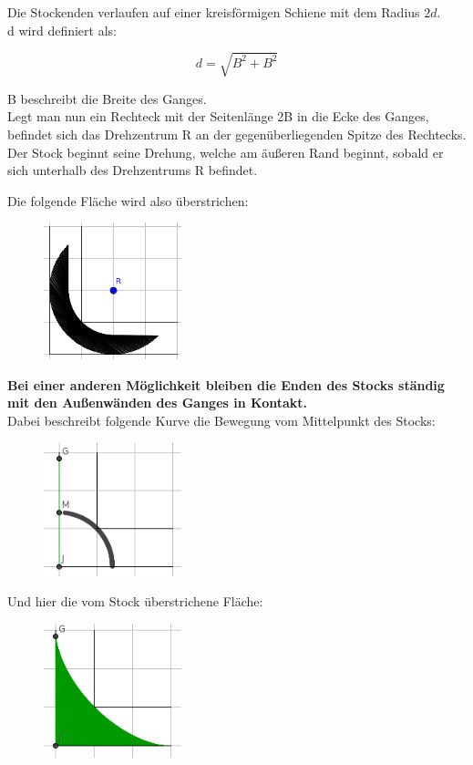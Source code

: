 \documentclass[a4paper,11pt]{article}
\begin{document}
Die Stockenden verlaufen auf einer kreisförmigen Schiene mit dem Radius $2d$. \\
d wird definiert als:

\[ d = \sqrt{B^2+B^2} \]

B beschreibt die Breite des Ganges. \\
Legt man nun ein Rechteck mit der Seitenlänge 2B in die Ecke des Ganges, befindet sich das Drehzentrum R an der gegenüberliegenden Spitze des Rechtecks. \\
Der Stock beginnt seine Drehung, welche am \"au\ss eren Rand beginnt, sobald er sich unterhalb des Drehzentrums R befindet.

Die folgende Fl\"ache wird also \"uberstrichen:
\begin{figure}[H] 
        \centering
        \includegraphics[width=4cm]{img/A4_2.png}
\end{figure}

\textbf{Bei einer anderen M\"oglichkeit bleiben die Enden des Stocks st\"andig mit den Au\ss enw\"anden des Ganges in Kontakt.} \\
Dabei beschreibt folgende Kurve die Bewegung vom Mittelpunkt des Stocks:
\begin{figure}[H] 
        \centering
        \includegraphics[width=4cm]{img/A4_3.png}
\end{figure}

Und hier die vom Stock \"uberstrichene Fl\"ache:
\begin{figure}[H] 
        \centering
        \includegraphics[width=4cm]{img/A4_4.png}
\end{figure}
\end{document}
